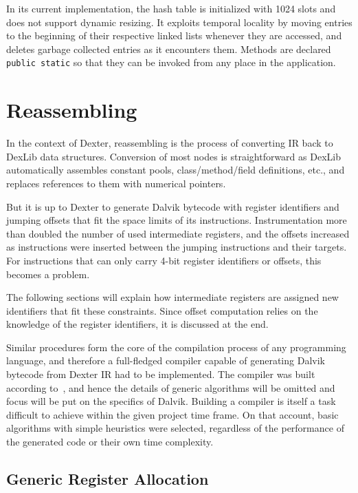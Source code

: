 \documentclass[12pt,twoside,notitlepage]{report}
\begin{document}
In its current implementation, the hash table is initialized with 1024 slots and does not support dynamic resizing. It exploits temporal locality by moving entries to the beginning of their respective linked lists whenever they are accessed, and deletes garbage collected entries as it encounters them. Methods are declared \verb$public static$ so that they can be invoked from any place in the application.

\section{Reassembling}

In the context of Dexter, reassembling is the process of converting IR back to DexLib data structures. Conversion of most nodes is straightforward as DexLib automatically assembles constant pools, class/method/field definitions, etc., and replaces references to them with numerical pointers. 

But it is up to Dexter to generate Dalvik bytecode with register identifiers and jumping offsets that fit the space limits of its instructions. Instrumentation more than doubled the number of used intermediate registers, and the offsets increased as instructions were inserted between the jumping instructions and their targets. For instructions that can only carry 4-bit register identifiers or offsets, this becomes a problem.

The following sections will explain how intermediate registers are assigned new identifiers that fit these constraints. Since offset computation relies on the knowledge of the register identifiers, it is discussed at the end.

Similar procedures form the core of the compilation process of any programming language, and therefore a full-fledged compiler capable of generating Dalvik bytecode from Dexter IR had to be implemented. The compiler was built according to~\cite{Appel:2003:MCI:599718}, and hence the details of generic algorithms will be omitted and focus will be put on the specifics of Dalvik. Building a compiler is itself a task difficult to achieve within the given project time frame. On that account, basic algorithms with simple heuristics were selected, regardless of the performance of the generated code or their own time complexity.

\subsection{Generic Register Allocation}
\end{document}
